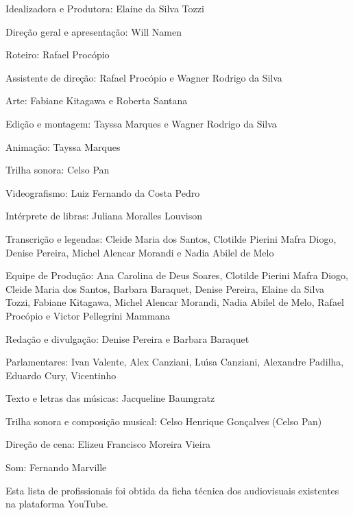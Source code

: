 \documentclass[
12pt,		%
openright,	%
twoside,  %
a4paper,			%
chapter=TITLE,		%
english,			%
french,				%
spanish,			%
brazil				%
]{USPSC-classe/USPSC}
\begin{document}
\begin{alineas}
\item Idealizadora e Produtora: Elaine da Silva Tozzi
\item Dire\c{c}\~ao geral e apresenta\c{c}\~ao: Will Namen
\item Roteiro: Rafael Proc\'opio
\item Assistente de dire\c{c}\~ao: Rafael Proc\'opio e Wagner Rodrigo da Silva
\item Arte: Fabiane Kitagawa e Roberta Santana
\item Edi\c{c}\~ao e montagem: Tayssa Marques e Wagner Rodrigo da Silva
\item Anima\c{c}\~ao: Tayssa Marques
\item Trilha sonora: Celso Pan
\item Videografismo: Luiz Fernando da Costa Pedro
\item Int\'erprete de libras: Juliana Moralles Louvison
\item Transcri\c{c}\~ao e legendas: Cleide Maria dos Santos, Clotilde Pierini Mafra Diogo, Denise Pereira, Michel Alencar Morandi e Nadia Abilel de Melo
\item Equipe de Produ\c{c}\~ao: Ana Carolina de Deus Soares, Clotilde Pierini Mafra Diogo, Cleide Maria dos Santos, Barbara Baraquet, Denise Pereira, Elaine da Silva Tozzi, Fabiane Kitagawa, Michel Alencar Morandi, Nadia Abilel de Melo, Rafael Proc\'opio e Victor Pellegrini Mammana
\item Reda\c{c}\~ao e divulga\c{c}\~ao: Denise Pereira e Barbara Baraquet
\item Parlamentares: Ivan Valente, Alex Canziani, Lu\'{\i}sa Canziani, Alexandre Padilha, Eduardo Cury, Vicentinho
\item Texto e letras das m\'usicas: Jacqueline Baumgratz
\item Trilha sonora e composi\c{c}\~ao musical: Celso Henrique Gon\c{c}alves (Celso Pan)
\item Dire\c{c}\~ao de cena: Elizeu Francisco Moreira Vieira
\item Som: Fernando Marville
\end{alineas}

Esta lista de profissionais foi obtida da ficha t\'ecnica dos audiovisuais existentes na plataforma YouTube.









\end{document}
